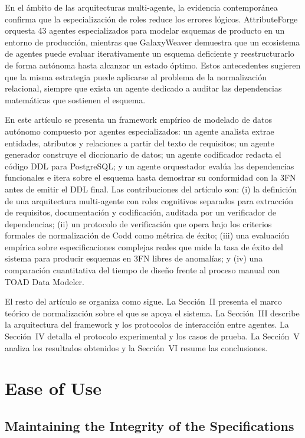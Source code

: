 \documentclass[conference]{IEEEtran}
\begin{document}
En el ámbito de las arquitecturas multi-agente, la evidencia contemporánea confirma que la especialización de roles reduce los errores lógicos. AttributeForge \cite{huang2025attributeforge} orquesta 43 agentes especializados para modelar esquemas de producto en un entorno de producción, mientras que GalaxyWeaver \cite{tong2025galaxyweaver} demuestra que un ecosistema de agentes puede evaluar iterativamente un esquema deficiente y reestructurarlo de forma autónoma hasta alcanzar un estado óptimo. Estos antecedentes sugieren que la misma estrategia puede aplicarse al problema de la normalización relacional, siempre que exista un agente dedicado a auditar las dependencias matemáticas que sostienen el esquema.

En este artículo se presenta un framework empírico de modelado de datos autónomo compuesto por agentes especializados: un agente analista extrae entidades, atributos y relaciones a partir del texto de requisitos; un agente generador construye el diccionario de datos; un agente codificador redacta el código DDL para PostgreSQL; y un agente orquestador evalúa las dependencias funcionales e itera sobre el esquema hasta demostrar su conformidad con la 3FN antes de emitir el DDL final. Las contribuciones del artículo son: (i) la definición de una arquitectura multi-agente con roles cognitivos separados para extracción de requisitos, documentación y codificación, auditada por un verificador de dependencias; (ii) un protocolo de verificación que opera bajo los criterios formales de normalización de Codd \cite{codd1971} como métrica de éxito; (iii) una evaluación empírica sobre especificaciones complejas reales que mide la tasa de éxito del sistema para producir esquemas en 3FN libres de anomalías; y (iv) una comparación cuantitativa del tiempo de diseño frente al proceso manual con TOAD Data Modeler.

El resto del artículo se organiza como sigue. La Sección~II presenta el marco teórico de normalización sobre el que se apoya el sistema. La Sección~III describe la arquitectura del framework y los protocolos de interacción entre agentes. La Sección~IV detalla el protocolo experimental y los casos de prueba. La Sección~V analiza los resultados obtenidos y la Sección~VI resume las conclusiones.

\section{Ease of Use}

\subsection{Maintaining the Integrity of the Specifications}
\end{document}
